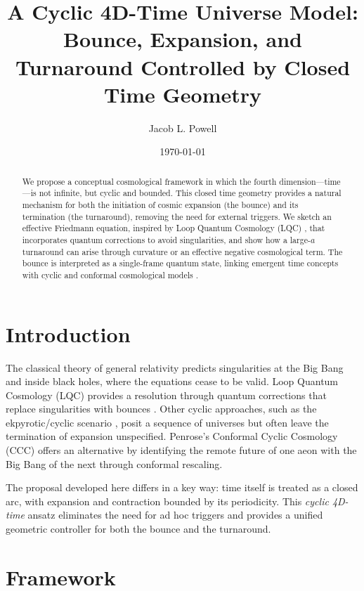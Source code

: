 \documentclass[12pt]{article}
\title{A Cyclic 4D-Time Universe Model: Bounce, Expansion, and Turnaround Controlled by Closed Time Geometry}
\author{Jacob L. Powell}
\date{\today}
\begin{document}
\maketitle

\begin{abstract}
We propose a conceptual cosmological framework in which the fourth dimension---time---is 
not infinite, but cyclic and bounded. This closed time geometry provides a natural mechanism 
for both the initiation of cosmic expansion (the bounce) and its termination (the turnaround), 
removing the need for external triggers. We sketch an effective Friedmann equation, inspired by 
Loop Quantum Cosmology (LQC) \cite{Ashtekar2006,Bojowald2001}, that incorporates quantum 
corrections to avoid singularities, and show how a large-$a$ turnaround can arise through curvature 
or an effective negative cosmological term. The bounce is interpreted as a single-frame quantum 
state, linking emergent time concepts \cite{Hartle1983,Rovelli2017} with cyclic and conformal 
cosmological models \cite{Steinhardt2002,Penrose2010}.
\end{abstract}

\section{Introduction}
The classical theory of general relativity predicts singularities at the Big Bang and inside 
black holes, where the equations cease to be valid. Loop Quantum Cosmology (LQC) provides 
a resolution through quantum corrections that replace singularities with bounces 
\cite{Ashtekar2006,Bojowald2001}. Other cyclic approaches, such as the ekpyrotic/cyclic 
scenario \cite{Steinhardt2002}, posit a sequence of universes but often leave the termination 
of expansion unspecified. Penrose's Conformal Cyclic Cosmology (CCC) \cite{Penrose2010} 
offers an alternative by identifying the remote future of one aeon with the Big Bang of the 
next through conformal rescaling. 

The proposal developed here differs in a key way: time itself is treated as a closed arc, 
with expansion and contraction bounded by its periodicity. This \emph{cyclic 4D-time} ansatz 
eliminates the need for ad hoc triggers and provides a unified geometric controller for both 
the bounce and the turnaround.

\section{Framework}
\end{document}
